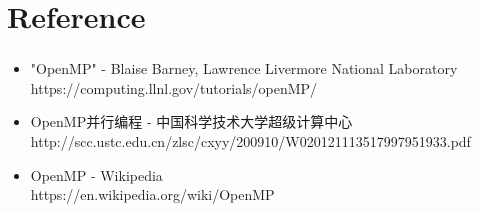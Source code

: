 \documentclass{beamer}
\begin{document}
	\section{Reference}
	\begin{frame}
		\frametitle{\insertsection}
		\begin{itemize}
			\item \footnotesize "OpenMP" - Blaise Barney, Lawrence Livermore National Laboratory\\https://computing.llnl.gov/tutorials/openMP/
			\item \footnotesize OpenMP并行编程 - 中国科学技术大学超级计算中心\\http://scc.ustc.edu.cn/zlsc/cxyy/200910/W020121113517997951933.pdf
			\item \footnotesize OpenMP - Wikipedia\\
			https://en.wikipedia.org/wiki/OpenMP
		\end{itemize}
	\end{frame}
\end{document}
